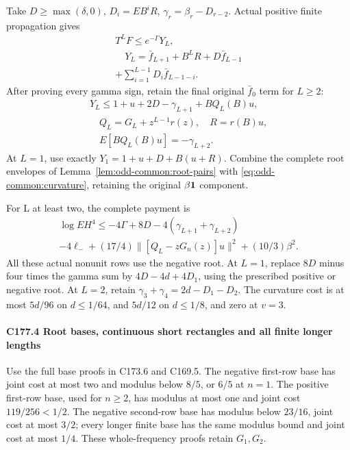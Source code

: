 Take \(D\ge\max(\delta,\allowbreak \allowbreak  0)\), \(D_i=EB^iR\), \(\gamma_r=\beta_r-D_{r-2}\). Actual positive finite propagation gives
\[
\begin{gathered}
T^LF\le e^{-\Gamma}Y_L,\\
\quad Y_L=\bar f_{L+1}+B^LR+D\bar f_{L-1}\\
+\sum_{i=1}^{L-1}D_i \bar f_{L-1-i}.
\end{gathered}\tag{C177.T184.14}
\]
After proving every gamma sign, retain the final original \(\bar f_0\) term for \(L\ge2\):
\[
\begin{gathered}
Y_L\le1+u+2D-\gamma_{L+1}+BQ_L(B)u,\\
\quad Q_L=G_L+z^{L-1}r(z),\quad R=r(B)u,\\
\quad E[BQ_L(B)u]=-\gamma_{L+2}.
\end{gathered}\tag{C177.T184.15}
\]
At \(L=1\), use exactly \(Y_1=1+u+D+B(u+R)\). Combine the complete root envelopes of Lemma~\ref{lem:odd-common:root-pairs} with \eqref{eq:odd-common:curvature}, retaining the original $\beta\mathbf1$ component.


For L at least two, the complete payment is
\[
\begin{gathered}
\log EH^4\le-4\Gamma+8D-4(\gamma_{L+1}+\gamma_{L+2})\\
-4\ell_-+(17/4)\|[Q_L-zG_n(z)]u\|^2+(10/3)\beta^2.
\end{gathered}\tag{C177.T184.18}
\]
All these actual nonunit rows use the negative root. At \(L=1\), replace \(8D\) minus four times the gamma sum by \(4D-4d+4D_1\), using the prescribed positive or negative root. At \(L=2\), retain \(\gamma_3+\gamma_4=2d-D_1-D_2\). The curvature cost is at most \(5d/96\) on \(d\le1/64\), and \(5d/12\) on \(d\le1/8\), and zero at \(v=3\).

\paragraph{C177.4 Root bases, continuous short rectangles and all finite longer lengths}

Use the full base proofs in C173.6 and C169.5. The negative first-row base has joint cost at most two and modulus below \(8/5\), or \(6/5\) at \(n=1\). The positive first-row base, used for \(n\ge2\), has modulus at most one and joint cost \(119/256<1/2\). The negative second-row base has modulus below \(23/16\), joint cost at most \(3/2\); every longer finite base has the same modulus bound and joint cost at most \(1/4\). These whole-frequency proofs retain \(G_1,\allowbreak \allowbreak  G_2\).


